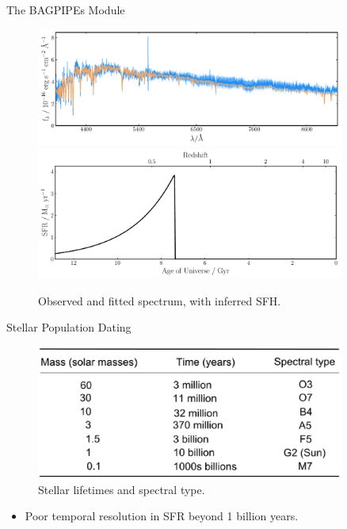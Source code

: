 \documentclass{beamer}
\begin{document}
\begin{frame}{The BAGPIPEs Module}
  \begin{figure}
    \centering
    \includegraphics[width=0.9\textwidth]{host_hyz_specwerr_fit}
    \includegraphics[width=0.9\textwidth]{host_hyz_specwerr_sfh}
    \caption{Observed and fitted spectrum, with inferred SFH.}
  \end{figure}
\end{frame}

\begin{frame}{Stellar Population Dating}
  \begin{figure}
    \centering
    \includegraphics[width=0.9\textwidth]{lifetimes}
    \caption{Stellar lifetimes and spectral type.}
  \end{figure}
  \begin{itemize}
    \item Poor temporal resolution in SFR beyond 1 billion years.
  \end{itemize}
\end{frame}
\end{document}
